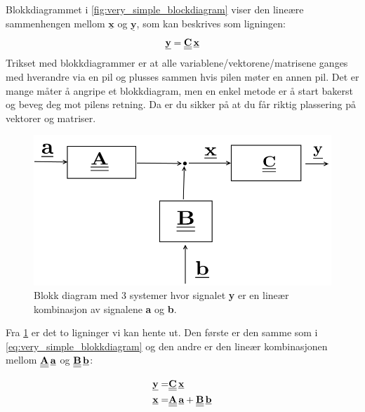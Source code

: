 Blokkdiagrammet i \cref{fig:very_simple_blockdiagram} viser den lineære sammenhengen mellom $\underline{\textbf{x}}$ og $\underline{\textbf{y}}$, som kan beskrives som ligningen: 
\begin{equation}
    \label{eq:very_simple_blokkdiagram}
    \underline{\textbf{y}} = \underline{\underline{\textbf{C}}}\,\underline{\textbf{x}}
\end{equation}
Trikset med blokkdiagrammer er at alle variablene/vektorene/matrisene ganges med hverandre via en pil og plusses sammen hvis pilen møter en annen pil. Det er mange måter å angripe et blokkdiagram, men en enkel metode er å start bakerst og beveg deg mot pilens retning. Da er du sikker på at du får riktig plassering på vektorer og matriser.

\begin{figure}[H]
    \centering
    \includegraphics[scale=0.5]{Figures/simple_blockdiagram.png}
    \caption{Blokk diagram med 3 systemer hvor signalet \textbf{y} er en lineær kombinasjon av signalene \textbf{a} og \textbf{b}.}
    \label{fig:simple_blokkdiagram1}
\end{figure}

Fra \cref{fig:simple_blokkdiagram1} er det to ligninger vi kan hente ut. Den første er den samme som i \cref{eq:very_simple_blokkdiagram} og den andre er den lineær kombinasjonen mellom $\underline{\underline{\textbf{A}}}\,\underline{\textbf{a}}$ og $\underline{\underline{\textbf{B}}}\,\underline{\textbf{b}}$:

\begin{align}
       \label{eq:simple_blokkdiagram}
    \underline{\textbf{y}} =& \underline{\underline{\textbf{C}}}\,\underline{\textbf{x}} \\
    \underline{\textbf{x}} =& \underline{\underline{\textbf{A}}}\,\underline{\textbf{a}} + \underline{\underline{\textbf{B}}}\,\underline{\textbf{b}}
\end{align}

